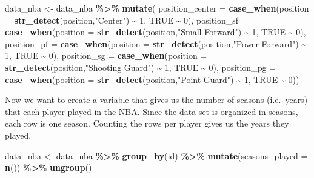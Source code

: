 \documentclass[
]{book}
\newenvironment{Shaded}{\begin{snugshade}}{\end{snugshade}}
\newcommand{\AttributeTok}[1]{\textcolor[rgb]{0.13,0.29,0.53}{#1}}
\newcommand{\ConstantTok}[1]{\textcolor[rgb]{0.56,0.35,0.01}{#1}}
\newcommand{\DecValTok}[1]{\textcolor[rgb]{0.00,0.00,0.81}{#1}}
\newcommand{\FunctionTok}[1]{\textcolor[rgb]{0.13,0.29,0.53}{\textbf{#1}}}
\newcommand{\NormalTok}[1]{#1}
\newcommand{\OtherTok}[1]{\textcolor[rgb]{0.56,0.35,0.01}{#1}}
\newcommand{\SpecialCharTok}[1]{\textcolor[rgb]{0.81,0.36,0.00}{\textbf{#1}}}
\newcommand{\StringTok}[1]{\textcolor[rgb]{0.31,0.60,0.02}{#1}}
\begin{document}
\begin{Shaded}
\begin{Highlighting}[]
\NormalTok{data\_nba }\OtherTok{\textless{}{-}}\NormalTok{ data\_nba }\SpecialCharTok{\%\textgreater{}\%}
  \FunctionTok{mutate}\NormalTok{(}
    \AttributeTok{position\_center =} 
      \FunctionTok{case\_when}\NormalTok{(}\AttributeTok{position =} \FunctionTok{str\_detect}\NormalTok{(position,}\StringTok{"Center"}\NormalTok{) }\SpecialCharTok{\textasciitilde{}} \DecValTok{1}\NormalTok{,}
                \ConstantTok{TRUE} \SpecialCharTok{\textasciitilde{}} \DecValTok{0}\NormalTok{),}
    \AttributeTok{position\_sf =} 
      \FunctionTok{case\_when}\NormalTok{(}\AttributeTok{position =} \FunctionTok{str\_detect}\NormalTok{(position,}\StringTok{"Small Forward"}\NormalTok{) }\SpecialCharTok{\textasciitilde{}} \DecValTok{1}\NormalTok{,}
                \ConstantTok{TRUE} \SpecialCharTok{\textasciitilde{}} \DecValTok{0}\NormalTok{),}
    \AttributeTok{position\_pf =} 
      \FunctionTok{case\_when}\NormalTok{(}\AttributeTok{position =} \FunctionTok{str\_detect}\NormalTok{(position,}\StringTok{"Power Forward"}\NormalTok{) }\SpecialCharTok{\textasciitilde{}} \DecValTok{1}\NormalTok{,}
                \ConstantTok{TRUE} \SpecialCharTok{\textasciitilde{}} \DecValTok{0}\NormalTok{),}
    \AttributeTok{position\_sg =} 
      \FunctionTok{case\_when}\NormalTok{(}\AttributeTok{position =} \FunctionTok{str\_detect}\NormalTok{(position,}\StringTok{"Shooting Guard"}\NormalTok{) }\SpecialCharTok{\textasciitilde{}} \DecValTok{1}\NormalTok{,}
                \ConstantTok{TRUE} \SpecialCharTok{\textasciitilde{}} \DecValTok{0}\NormalTok{),}
    \AttributeTok{position\_pg =} 
      \FunctionTok{case\_when}\NormalTok{(}\AttributeTok{position =} \FunctionTok{str\_detect}\NormalTok{(position,}\StringTok{"Point Guard"}\NormalTok{) }\SpecialCharTok{\textasciitilde{}} \DecValTok{1}\NormalTok{,}
                \ConstantTok{TRUE} \SpecialCharTok{\textasciitilde{}} \DecValTok{0}\NormalTok{))}
\end{Highlighting}
\end{Shaded}

Now we want to create a variable that gives us the number of seasons (i.e.~years) that each player played in the NBA. Since the data set is organized in seasons, each row is one season. Counting the rows per player gives us the years they played.

\begin{Shaded}
\begin{Highlighting}[]
\NormalTok{data\_nba }\OtherTok{\textless{}{-}}\NormalTok{ data\_nba }\SpecialCharTok{\%\textgreater{}\%} 
  \FunctionTok{group\_by}\NormalTok{(id) }\SpecialCharTok{\%\textgreater{}\%} 
  \FunctionTok{mutate}\NormalTok{(}\AttributeTok{seasons\_played =} \FunctionTok{n}\NormalTok{()) }\SpecialCharTok{\%\textgreater{}\%} 
  \FunctionTok{ungroup}\NormalTok{()}
\end{Highlighting}
\end{Shaded}
\end{document}
